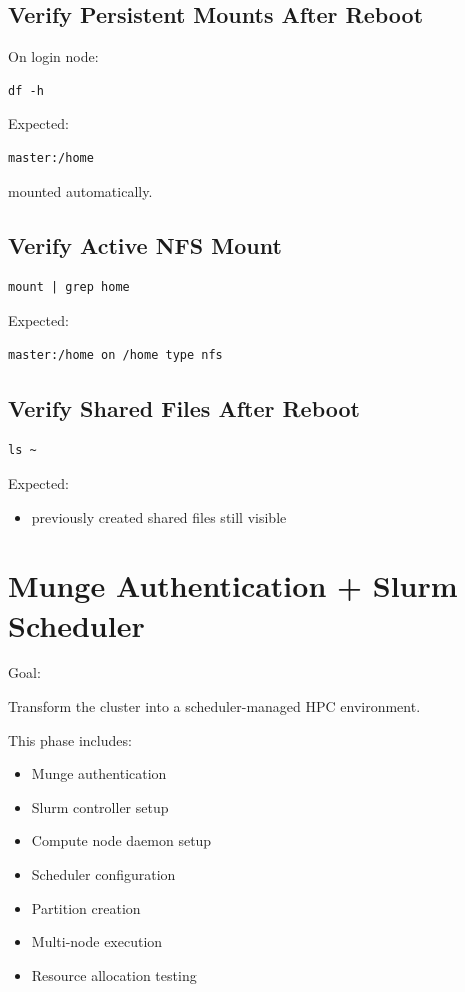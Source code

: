 \documentclass[11pt]{article}
\begin{document}
\subsection{Verify Persistent Mounts After Reboot}
\label{sec:org02e2e62}

On login node:

\begin{verbatim}
df -h
\end{verbatim}

Expected:

\begin{verbatim}
master:/home
\end{verbatim}

mounted automatically.
\subsection{Verify Active NFS Mount}
\label{sec:orgd6b9e97}

\begin{verbatim}
mount | grep home
\end{verbatim}

Expected:

\begin{verbatim}
master:/home on /home type nfs
\end{verbatim}
\subsection{Verify Shared Files After Reboot}
\label{sec:orgabb6e60}

\begin{verbatim}
ls ~
\end{verbatim}

Expected:
\begin{itemize}
\item previously created shared files still visible
\end{itemize}
\section{Munge Authentication + Slurm Scheduler}
\label{sec:orgf1f5c78}

Goal:

Transform the cluster into a scheduler-managed HPC environment.

This phase includes:

\begin{itemize}
\item Munge authentication
\item Slurm controller setup
\item Compute node daemon setup
\item Scheduler configuration
\item Partition creation
\item Multi-node execution
\item Resource allocation testing
\end{itemize}
\end{document}

